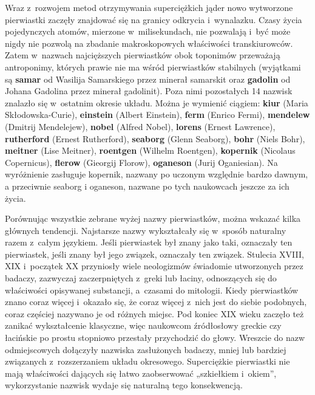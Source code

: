 Wraz z~rozwojem metod otrzymywania superciężkich jąder nowo wytworzone
pierwiastki zaczęły znajdować się na granicy odkrycia i~wynalazku. Czasy
życia pojedynczych atomów, mierzone w~milisekundach, nie pozwalają i~być
może nigdy nie pozwolą na zbadanie makroskopowych właściwości
transkiurowców. Zatem w~nazwach najcięższych pierwiastków obok toponimów
przeważają antroponimy, których prawie nie ma wśród pierwiastków
stabilnych
(wyjątkami są \textbf{samar} od Wasilija Samarskiego przez minerał samarskit oraz \textbf{gadolin} od Johana Gadolina przez minerał gadolinit).
Poza nimi pozostałych 14 nazwisk znalazło się w~ostatnim
okresie układu. Można je wymienić ciągiem: \textbf{kiur} (Maria
Skłodowska-Curie), \textbf{einstein} (Albert Einstein), \textbf{ferm}
(Enrico Fermi), \textbf{mendelew} (Dmitrij Mendelejew), \textbf{nobel}
(Alfred Nobel), \textbf{lorens} (Ernest Lawrence), \textbf{rutherford}
(Ernest Rutherford), \textbf{seaborg} (Glenn Seaborg), \textbf{bohr}
(Niels Bohr), \textbf{meitner} (Lise Meitner), \textbf{roentgen}
(Wilhelm Roentgen), \textbf{kopernik} (Nicolaus Copernicus),
\textbf{flerow} (Gieorgij Florow), \textbf{oganeson} (Jurij Oganiesian).
Na wyróżnienie zasługuje kopernik, nazwany po uczonym względnie bardzo dawnym, a przeciwnie seaborg i oganeson, nazwane po tych naukowcach jeszcze za ich życia.


Porównując wszystkie zebrane wyżej nazwy pierwiastków, można wskazać
kilka głównych tendencji. Najstarsze nazwy wykształcały się w~sposób
naturalny razem z~całym językiem. Jeśli pierwiastek był znany jako taki,
oznaczały ten pierwiastek, jeśli znany był jego związek, oznaczały ten
związek. Stulecia XVIII, XIX i~początek XX przyniosły wiele neologizmów
świadomie utworzonych przez badaczy, zazwyczaj zaczerpniętych z~greki
lub łaciny, odnoszących się do właściwości opisywanej substancji, a~czasami do mitologii. Kiedy pierwiastków znano coraz więcej i~okazało
się, że coraz więcej z~nich jest do siebie podobnych, coraz częściej
nazywano je od różnych miejsc. Pod koniec XIX wieku zaczęło też zanikać
wykształcenie klasyczne, więc naukowcom źródłosłowy greckie czy
łacińskie po prostu stopniowo przestały przychodzić do głowy. Wreszcie
do nazw odmiejscowych dołączyły nazwiska zasłużonych badaczy, mniej lub
bardziej związanych z~rozszerzaniem układu okresowego. Superciężkie
pierwiastki nie mają właściwości dających się łatwo zaobserwować
„szkiełkiem i~okiem'', wykorzystanie nazwisk wydaje się naturalną tego
konsekwencją.

